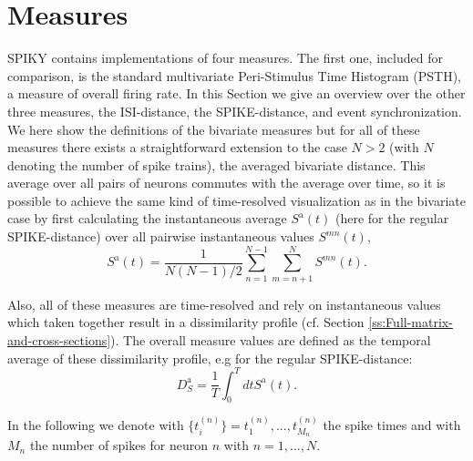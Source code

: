 \documentclass[10pt,twocolumn]{elsart5p}
\begin{document}
%
%
\section{\label{s:Measures} Measures}

SPIKY contains implementations of four measures. The first one, included for comparison, is the standard multivariate Peri-Stimulus Time Histogram (PSTH), a measure of overall firing rate. In this Section we give an overview over the other three measures, the ISI-distance, the SPIKE-distance, and event synchronization. We here show the definitions of the bivariate measures but for all of these measures there exists a straightforward extension to the case $N > 2$ (with $N$ denoting the number of spike trains), the averaged bivariate distance. This average over all pairs of neurons commutes with the average over time, so it is possible to achieve the same kind of time-resolved visualization as in the bivariate case by first calculating the instantaneous average $S^{\mathrm {a}} (t)$ (here for the regular SPIKE-distance) over all pairwise instantaneous values $S^{mn} (t)$,
%
\begin{equation} \label{eq:Bivariate-Average}
    S^{\mathrm {a}} (t) = \frac{1}{N(N-1)/2}\sum_{n=1}^{N-1} \sum_{m=n+1}^N S^{mn} (t).
\end{equation}

Also, all of these measures are time-resolved and rely on instantaneous values which taken together result in a dissimilarity profile (cf. Section \ref{ss:Full-matrix-and-cross-sections}). The overall measure values are defined as the temporal average of these dissimilarity profile, e.g for the regular SPIKE-distance:
%
\begin{equation} \label{eq:Temporal-Average2}
    D_S^{\mathrm {a}} = \frac{1}{T} \int_0^T dt S^{\mathrm {a}} (t).
\end{equation}

In the following we denote with $\{t_i^{(n)}\} = {t_1^{(n)},...,t_{M_n}^{(n)}}$ the spike times and with $M_n$ the number of spikes for neuron $n$ with $n = 1,...,N$.
\end{document}
